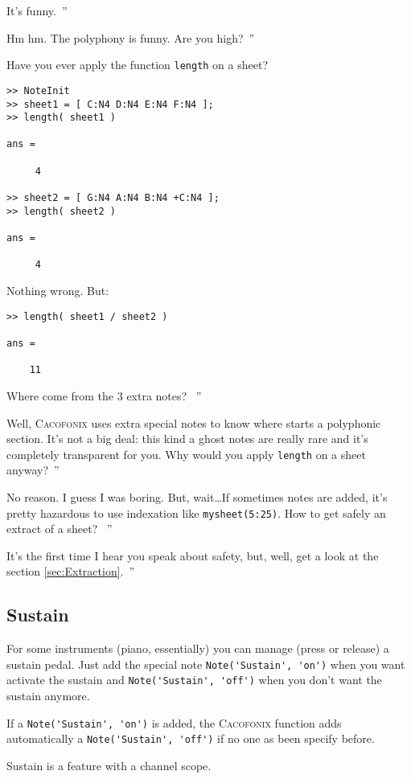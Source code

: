 \documentclass{article}
\newcommand{\cacofonix}{\textsc{Cacofonix}\xspace}
\newenvironment{meenv}{ \par \noindent \makebox[6em][r]{ \textcolor{mecolor}{Me}: `` --~}}{~''}
\newenvironment{myselfenv}{ \par \noindent \makebox[6em][r]{ \textcolor{myselfcolor}{Myself}: `` --~}}{~''}
\newcommand{\me}[1]{\begin{meenv}#1\end{meenv}}
\newcommand{\myself}[1]{\begin{myselfenv}#1\end{myselfenv}}
\begin{document}
\me{It's funny.}
\myself{Hm hm. The polyphony is funny. Are you high?}
\begin{meenv}%
Have you ever apply the function \lstinline!length! on a sheet?
\begin{lstlisting}
>> NoteInit
>> sheet1 = [ C:N4 D:N4 E:N4 F:N4 ];
>> length( sheet1 )

ans =

     4

>> sheet2 = [ G:N4 A:N4 B:N4 +C:N4 ];
>> length( sheet2 )

ans =

     4

\end{lstlisting}
Nothing wrong. But:
\begin{lstlisting}
>> length( sheet1 / sheet2 )

ans =

    11

\end{lstlisting}
Where come from the $3$ extra notes?%
\end{meenv}
\myself{Well, \cacofonix uses extra special notes to know where starts a polyphonic section. It's not a big deal: this kind a ghost notes are really rare and it's completely transparent for you. Why would you apply \lstinline!length! on a sheet anyway?}
\begin{meenv}%
No reason. I guess I was boring. But, wait\dots If sometimes notes are added, it's pretty hazardous to use indexation like \lstinline!mysheet(5:25)!. How to get safely an extract of a sheet?%
\end{meenv}
\myself{It's the first time I hear you speak about safety, but, well, get a look at the section \ref{sec:Extraction}.} 

\subsection{Sustain}
\label{sec:Sustain}

For some instruments (piano, essentially) you can manage (press or release) a sustain pedal. Just add the special note \lstinline!Note('Sustain', 'on')! when you want activate the sustain and \lstinline!Note('Sustain', 'off')! when you don't want the sustain anymore.

If a \lstinline!Note('Sustain', 'on')! is added, the \cacofonix function adds automatically a \lstinline!Note('Sustain', 'off')! if no one as been specify before.

Sustain is a feature with a channel scope.
\end{document}
